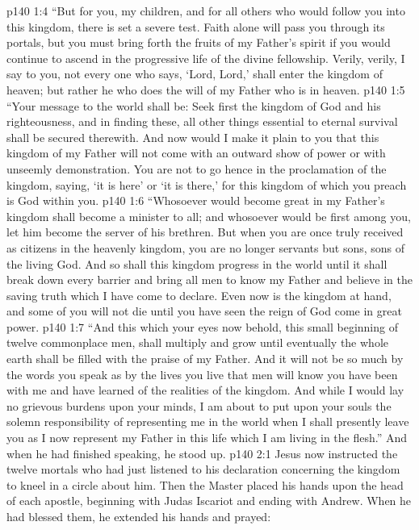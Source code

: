 \vs p140 1:4 \textcolor{ubdarkred}{“But for you, my children, and for all others who would follow you into this kingdom, there is set a severe test. Faith alone will pass you through its portals, but you must bring forth the fruits of my Father’s spirit if you would continue to ascend in the progressive life of the divine fellowship. Verily, verily, I say to you, not every one who says, ‘Lord, Lord,’ shall enter the kingdom of heaven; but rather he who does the will of my Father who is in heaven.}
\vs p140 1:5 \textcolor{ubdarkred}{“Your message to the world shall be: Seek first the kingdom of God and his righteousness, and in finding these, all other things essential to eternal survival shall be secured therewith. And now would I make it plain to you that this kingdom of my Father will not come with an outward show of power or with unseemly demonstration. You are not to go hence in the proclamation of the kingdom, saying, ‘it is here’ or ‘it is there,’ for this kingdom of which you preach is God within you.}
\vs p140 1:6 \textcolor{ubdarkred}{“Whosoever would become great in my Father’s kingdom shall become a minister to all; and whosoever would be first among you, let him become the server of his brethren. But when you are once truly received as citizens in the heavenly kingdom, you are no longer servants but sons, sons of the living God. And so shall this kingdom progress in the world until it shall break down every barrier and bring all men to know my Father and believe in the saving truth which I have come to declare. Even now is the kingdom at hand, and some of you will not die until you have seen the reign of God come in great power.}\plusone
\vs p140 1:7 \textcolor{ubdarkred}{“And this which your eyes now behold, this small beginning of twelve commonplace men, shall multiply and grow until eventually the whole earth shall be filled with the praise of my Father. And it will not be so much by the words you speak as by the lives you live that men will know you have been with me and have learned of the realities of the kingdom. And while I would lay no grievous burdens upon your minds, I am about to put upon your souls the solemn responsibility of representing me in the world when I shall presently leave you as I now represent my Father in this life which I am living in the flesh.”} And when he had finished speaking, he stood up.
\vs p140 2:1 Jesus now instructed the twelve mortals who had just listened to his declaration concerning the kingdom to kneel in a circle about him. Then the Master placed his hands upon the head of each apostle, beginning with Judas Iscariot and ending with Andrew. When he had blessed them, he extended his hands and prayed:
